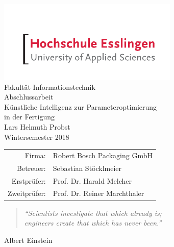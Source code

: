 

\usepackage[T1]{fontenc}
\usepackage[utf8]{inputenc}
\usepackage{graphicx}





\begin{titlepage}
\begin{center}
\includegraphics[scale=2.5]{images/he_logo.pdf}\\
\vspace{1cm} Fakultät Informationstechnik\\
\vspace{1.5cm} \Large Abschlussarbeit \\
\vspace{1.5cm} \Huge Künstliche Intelligenz zur Parameteroptimierung \\in der Fertigung\\
\vspace{1.5cm} \Large Lars Helmuth Probst\\\normalsize
\vspace{0.5cm} Wintersemester 2018\\\normalsize
\vfill{}
\begin{tabular}{rl}
Firma: & Robert Bosch Packaging GmbH\\[0.5cm]
Betreuer: & Sebastian Stöcklmeier\\[0.5cm]
Erstprüfer: & Prof. Dr. Harald Melcher\\[0.5cm]
Zweitprüfer: & Prof. Dr. Reiner Marchthaler\\
\end{tabular}
\end{center}
\end{titlepage}

\thispagestyle{empty}
\vspace*{2cm}
\begin{center}
\begin{minipage}{12cm}
\begin{center}
\end{center}
\end{minipage}

\vfill{}

\begin{minipage}{10cm}
\begin{quote}
\textit{"`Scientists investigate that which already is;\\ engineers create that which has never been."'}
\end{quote}
\hfill Albert Einstein
\end{minipage}
\end{center}

